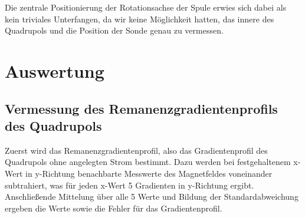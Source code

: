 \documentclass[bigchapter,colorback,accentcolor=tud4b,linedtoc,11pt]{tudreport}
\begin{document}
Die zentrale Positionierung der Rotationsachse der Spule erwies sich dabei als kein triviales Unterfangen, da wir keine Möglichkeit hatten, das innere des Quadrupols und die Position der Sonde genau zu vermessen.


\chapter{Auswertung}

\section{Vermessung des Remanenzgradientenprofils des Quadrupols}
Zuerst wird das Remanenzgradientenprofil, also das Gradientenprofil des Quadrupols ohne angelegten Strom bestimmt. Dazu werden bei festgehaltenem x-Wert in y-Richtung benachbarte Messwerte des Magnetfeldes voneinander subtrahiert, was für jeden x-Wert 5 Gradienten in y-Richtung ergibt. Anschließende Mittelung über alle 5 Werte und Bildung der Standardabweichung ergeben die Werte sowie die Fehler für das Gradientenprofil.
\begin{center}
\begin{figure}[H]
\end{figure}
\end{center}
\end{document}
